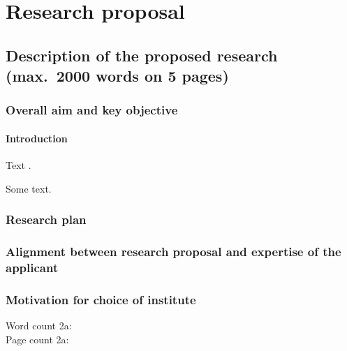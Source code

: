 \section{Research proposal}\label{sec:proposal}

\subsection{Description of the proposed research (max.~2000 words on 5 pages)}\label{sec:research}
\setcounter{respage}{-\value{page}}
\countem

\subsubsection{Overall aim and key objective}\label{sec:aim}

\paragraph{Introduction}\label{sec:intro}

Text \cite{clarke2018}.

\begin{mdframed}
    Some text.
\end{mdframed}

\subsubsection{Research plan}\label{sec:plan}



\subsubsection{Alignment between research proposal and expertise of the applicant}

\subsubsection{Motivation for choice of institute}\label{sec:institute}


\endcountem
\addtocounter{wordcount}{-30}  %
\addtocounter{respage}{\value{page}}

\vspace{2em}
Word count 2a:     \thewordcount{}\\
Page count 2a:     \\

